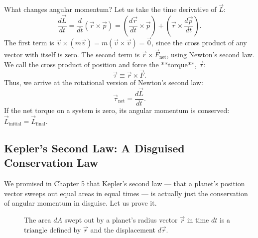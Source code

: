 What changes angular momentum? Let us take the time derivative of $\vec{L}$:
\begin{equation}
    \frac{d\vec{L}}{dt} = \frac{d}{dt}(\vec{r} \times \vec{p}) = \left(\frac{d\vec{r}}{dt} \times \vec{p}\right) + \left(\vec{r} \times \frac{d\vec{p}}{dt}\right).
\end{equation}
The first term is $\vec{v} \times (m\vec{v}) = m(\vec{v} \times \vec{v}) = \vec{0}$, since the cross product of any vector with itself is zero. The second term is $\vec{r} \times \vec{F}_{\text{net}}$, using Newton's second law. We call the cross product of position and force the **torque**, $\vec{\tau}$:
\begin{equation}
    \vec{\tau} \equiv \vec{r} \times \vec{F}.
\end{equation}
Thus, we arrive at the rotational version of Newton's second law:
\begin{equation}
    \vec{\tau}_{\text{net}} = \frac{d\vec{L}}{dt}.
\end{equation}
If the net torque on a system is zero, its angular momentum is conserved: $\vec{L}_{\text{initial}} = \vec{L}_{\text{final}}$.

\subsection{Kepler's Second Law: A Disguised Conservation Law}

We promised in Chapter 5 that Kepler's second law --- that a planet's position vector sweeps out equal areas in equal times --- is actually just the conservation of angular momentum in disguise. Let us prove it.

\begin{figure}[H]
\centering
{}
\caption{The area $dA$ swept out by a planet's radius vector $\vec{r}$ in time $dt$ is a triangle defined by $\vec{r}$ and the displacement $d\vec{r}$.}
\label{fig:kepler_proof}
\end{figure}

